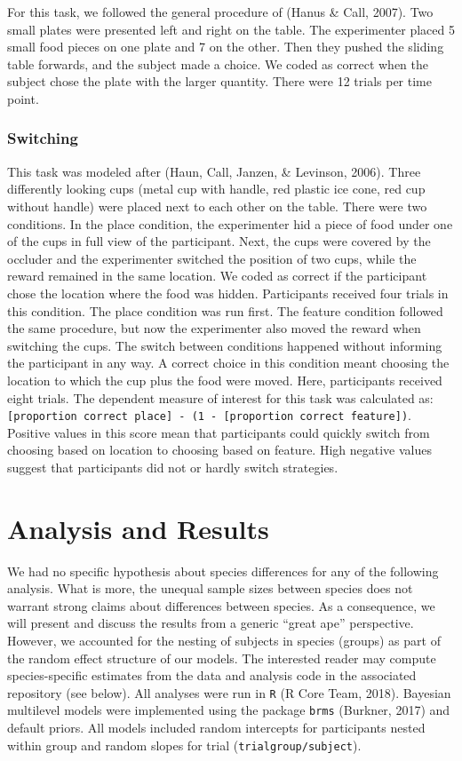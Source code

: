 \documentclass[10pt, letterpaper]{article}
\begin{document}
For this task, we followed the general procedure of (Hanus \& Call,
2007). Two small plates were presented left and right on the table. The
experimenter placed 5 small food pieces on one plate and 7 on the other.
Then they pushed the sliding table forwards, and the subject made a
choice. We coded as correct when the subject chose the plate with the
larger quantity. There were 12 trials per time point.

\hypertarget{switching}{%
\subsubsection{Switching}\label{switching}}

This task was modeled after (Haun, Call, Janzen, \& Levinson, 2006).
Three differently looking cups (metal cup with handle, red plastic ice
cone, red cup without handle) were placed next to each other on the
table. There were two conditions. In the place condition, the
experimenter hid a piece of food under one of the cups in full view of
the participant. Next, the cups were covered by the occluder and the
experimenter switched the position of two cups, while the reward
remained in the same location. We coded as correct if the participant
chose the location where the food was hidden. Participants received four
trials in this condition. The place condition was run first. The feature
condition followed the same procedure, but now the experimenter also
moved the reward when switching the cups. The switch between conditions
happened without informing the participant in any way. A correct choice
in this condition meant choosing the location to which the cup plus the
food were moved. Here, participants received eight trials. The dependent
measure of interest for this task was calculated as:
\texttt{{[}proportion\ correct\ place{]}\ -\ (1\ -\ {[}proportion\ correct\ feature{]})}.
Positive values in this score mean that participants could quickly
switch from choosing based on location to choosing based on feature.
High negative values suggest that participants did not or hardly switch
strategies.

\hypertarget{analysis-and-results}{%
\section{Analysis and Results}\label{analysis-and-results}}

We had no specific hypothesis about species differences for any of the
following analysis. What is more, the unequal sample sizes between
species does not warrant strong claims about differences between
species. As a consequence, we will present and discuss the results from
a generic ``great ape'' perspective. However, we accounted for the
nesting of subjects in species (groups) as part of the random effect
structure of our models. The interested reader may compute
species-specific estimates from the data and analysis code in the
associated repository (see below). All analyses were run in \texttt{R}
(R Core Team, 2018). Bayesian multilevel models were implemented using
the package \texttt{brms} (Burkner, 2017) and default priors. All models
included random intercepts for participants nested within group and
random slopes for trial (\texttt{trial\textbar{}group/subject}).
\end{document}
